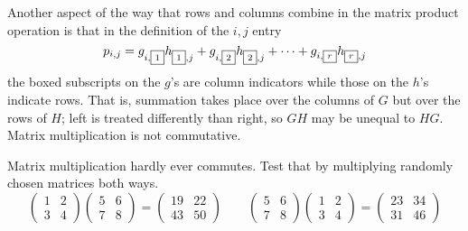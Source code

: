 Another aspect of the way that rows and columns combine in the
matrix product operation is that in the definition of the $i,j$ entry
\begin{equation*}
  p_{i,j}
  =
  g_{i,\fbox{\scriptsize \( 1 \)}}h_{\fbox{\scriptsize \( 1 \)},j}
   +g_{i,\fbox{\scriptsize \( 2 \)}}h_{\fbox{\scriptsize \( 2 \)},j}
   +\dots+g_{i,\fbox{\scriptsize \( r \)}}h_{\fbox{\scriptsize \( r \)},j}
\end{equation*}
the boxed subscripts on the $g$'s are column indicators while those on the
$h$'s indicate rows.
That is, summation takes place over the columns of $G$
but over the rows of $H$;
left is treated differently than right, so \( GH \) 
may be unequal to \( HG \).
Matrix multiplication is not commutative.

\begin{example}   \label{ex:MatMultNoCommute}
Matrix multiplication hardly ever commutes.
Test that by multiplying randomly chosen matrices both ways.
\begin{equation*}
    \begin{pmatrix}
      1  &2  \\
      3  &4
    \end{pmatrix}
    \begin{pmatrix}
      5  &6  \\
      7  &8
    \end{pmatrix}
  =
    \begin{pmatrix}
      19  &22  \\
      43  &50
    \end{pmatrix}
  \qquad
    \begin{pmatrix}
      5  &6  \\
      7  &8
    \end{pmatrix}
    \begin{pmatrix}
      1  &2  \\
      3  &4
    \end{pmatrix}
  =
    \begin{pmatrix}
      23  &34  \\
      31  &46
    \end{pmatrix}
\end{equation*}
\end{example}

